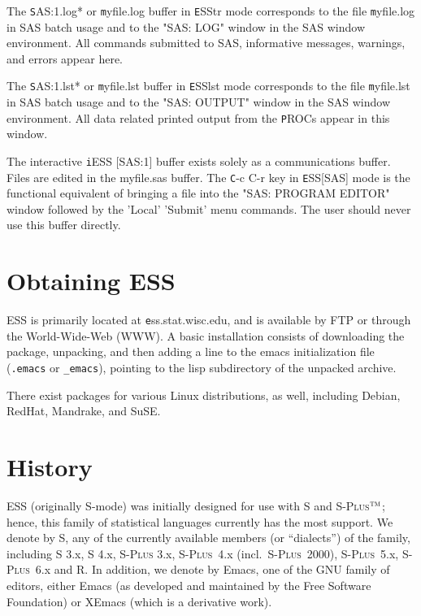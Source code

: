 \documentclass{article}
\newcommand*{\Splus}{\textsc{S-Plus}}
\newcommand{\tm}{$^{\mbox{\scriptsize\sc tm}}$}
\begin{document}
The {\texttt *SAS:1.log*} or {\texttt myfile.log} buffer in {\texttt ESStr} mode
corresponds to the file {\texttt myfile.log} in SAS batch usage and to the
"SAS: LOG" window in the SAS window environment.  All commands
submitted to SAS, informative messages, warnings, and errors appear
here.

The {\texttt *SAS:1.lst*} or {\texttt myfile.lst} buffer in {\texttt ESSlst} mode
corresponds to the file {\texttt myfile.lst} in SAS batch usage and to the
"SAS: OUTPUT" window in the SAS window environment.  All data related
printed output from the {\texttt PROC}s appear in this window.

The interactive {\texttt iESS [SAS:1]} buffer exists solely as a communications buffer.
Files are edited in the myfile.sas buffer.  The {\texttt C-c C-r} key in
{\texttt ESS[SAS]} mode is the functional equivalent of bringing a file into the
"SAS: PROGRAM EDITOR" window followed by the 'Local' 'Submit' menu
commands.  The user should never use this buffer directly.

\section{Obtaining ESS}
\label{sec:getIt}

ESS is primarily located at {\texttt ess.stat.wisc.edu}, and is available by FTP
or through the World-Wide-Web (WWW).  A basic installation consists of
downloading the package, unpacking, and then adding a line to the
emacs initialization file (\verb+.emacs+ or \verb+_emacs+), pointing
to the lisp subdirectory of the unpacked archive.

There exist packages for various Linux distributions, as well,
including Debian, RedHat, Mandrake, and SuSE.

\section{History}
\label{sec:history}

ESS (originally S-mode) was initially designed for use with S and
\Splus\tm; hence, this family of statistical languages currently has
the most support.  We denote by S, any of the currently available
members (or ``dialects'') of the family, including S 3.x, S 4.x, \Splus
3.x, \Splus~4.x (incl.\ \Splus~2000), \Splus~5.x, \Splus~6.x and R.
In addition, we
denote by Emacs, one of the GNU family of editors, either Emacs (as
developed and maintained by the Free Software Foundation) or XEmacs (which
is a derivative work).
\end{document}
